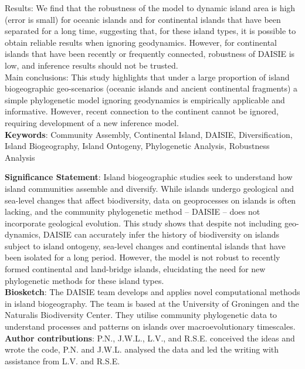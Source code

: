 \documentclass{article}
\begin{document}
\noindent Results: We find that the robustness of the model to dynamic island area is high (error is small) for oceanic islands and for continental islands that have been separated for a long time, suggesting that, for these island types, it is possible to obtain reliable results when ignoring geodynamics. However, for continental islands that have been recently or frequently connected, robustness of DAISIE is low, and inference results should not be trusted. \\

\noindent Main conclusions: This study highlights that under a large proportion of island biogeographic geo-scenarios (oceanic islands and ancient continental fragments) a simple phylogenetic model ignoring geodynamics is empirically applicable and informative. However, recent connection to the continent cannot be ignored, requiring development of a new inference model. \\

\noindent \textbf{Keywords}: Community Assembly, Continental Island, DAISIE, Diversification, Island Biogeography, Island Ontogeny, Phylogenetic Analysis, Robustness Analysis \\

\clearpage

\noindent \textbf{Significance Statement}: Island biogeographic studies seek to understand how island communities assemble and diversify. While islands undergo geological and sea-level changes that affect biodiversity, data on geoprocesses on islands is often lacking, and the community phylogenetic method – DAISIE – does not incorporate geological evolution. This study shows that despite not including geo-dynamics, DAISIE can accurately infer the history of biodiversity on islands subject to island ontogeny, sea-level changes and continental islands that have been isolated for a long period. However, the model is not robust to recently formed continental and land-bridge islands, elucidating the need for new phylogenetic methods for these island types. \\

\noindent \textbf{Biosketch}: The DAISIE team develops and applies novel computational methods in island biogeography. The team is based at the University of Groningen and the Naturalis Biodiversity Center. They utilise community phylogenetic data to understand processes and patterns on islands over macroevolutionary timescales. \\

\noindent \textbf{Author contributions}: P.N., J.W.L., L.V., and R.S.E. conceived the ideas and wrote the code, P.N. and J.W.L. analysed the data and led the writing with assistance from L.V. and R.S.E. \\
\end{document}

